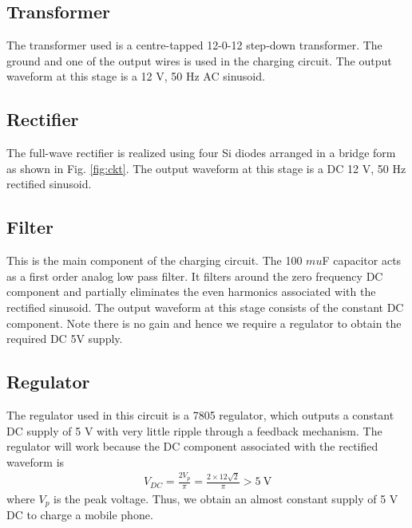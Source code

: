 \documentclass[journal,12pt,twocolumn]{IEEEtran}
\begin{document}
\subsection{Transformer}
The transformer used is a centre-tapped 12-0-12 step-down 
transformer. The ground and one of the output wires is used
in the charging circuit. The output waveform at this stage is
a 12 V, 50 Hz AC sinusoid.
\subsection{Rectifier}
The full-wave rectifier is realized using four Si diodes arranged in a
bridge form as shown in Fig. \ref{fig:ckt}. The output waveform at this
stage is a DC 12 V, 50 Hz rectified sinusoid.
\subsection{Filter}
This is the main component of the charging circuit. The 100 $mu$F
capacitor acts as a first order analog low pass filter. It filters
around the zero frequency DC component and partially eliminates the
even harmonics associated with the rectified sinusoid. The output 
waveform at this stage consists of the constant DC component. Note
there is no gain and hence we require a regulator to obtain the
required DC 5V supply.
\subsection{Regulator}
The regulator used in this circuit is a 7805 regulator, which outputs
a constant DC supply of 5 V with very little ripple through a 
feedback mechanism. The regulator will work because the DC component 
associated with the rectified waveform is
\begin{align}
    V_{DC} = \frac{2V_p}{\pi} = \frac{2\times12\sqrt{2}}{\pi} > \SI{5}{\V}
\end{align}
where $V_p$ is the peak voltage. Thus, we obtain an almost
constant supply of 5 V DC to charge a mobile phone.
\end{document}
